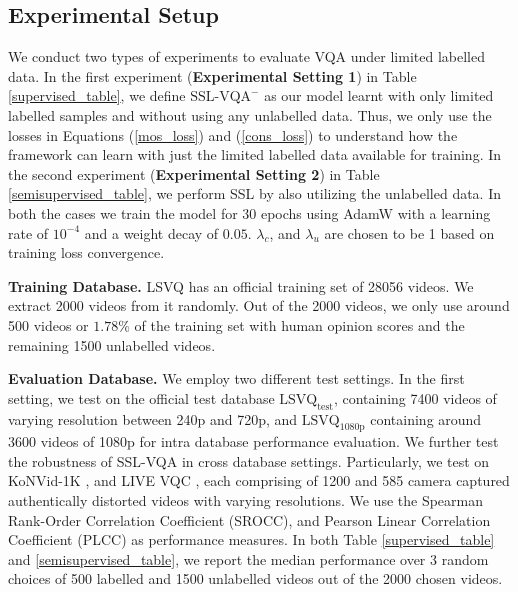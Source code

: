 \documentclass[10pt,twocolumn,letterpaper]{article}
\begin{document}
\subsection{Experimental Setup} %
We conduct two types of experiments to evaluate VQA under limited labelled data. In the first experiment (\textbf{Experimental Setting 1}) in Table \ref{supervised_table}, we define $\textrm{SSL-VQA}^{-}$ as our model learnt with only limited labelled samples and without using any unlabelled data. Thus, we only use the losses in Equations (\ref{mos_loss}) and (\ref{cons_loss}) to understand how the framework can learn with just the limited labelled data available for training. In the second experiment (\textbf{Experimental Setting 2}) in Table \ref{semisupervised_table}, we perform SSL by also utilizing the unlabelled data. In both the cases we train the model for 30 epochs using AdamW \cite{adamw} with a learning rate of  $10^{-4}$ and a weight decay of $0.05$. $\lambda_c$, and $\lambda_u$ are chosen to be 1 based on training loss convergence.%

\textbf{Training Database.} LSVQ \cite{patchVQ} has an official training set of 28056 videos. We extract 2000 videos from it randomly. Out of the 2000 videos, we only use around 500 videos or $1.78\%$ of the training set with human opinion scores and the remaining 1500 unlabelled videos.

\textbf{Evaluation Database.} We employ two different test settings. In the first setting, we test on the official test database $\textrm{LSVQ}_{\textrm{test}}$, 
 containing 7400 videos of varying resolution between 240p and 720p, and $\textrm{LSVQ}_{\textrm{1080p}}$ containing around 3600 videos of 1080p for intra database performance evaluation. We further test the robustness of SSL-VQA in cross database settings. Particularly, we test on KoNVid-1K \cite{konvid}, and LIVE VQC \cite{livevqc}, each comprising of 1200 and 585 camera captured authentically distorted videos with varying resolutions. We use the Spearman Rank-Order Correlation Coefficient (SROCC), and Pearson Linear Correlation Coefficient (PLCC) as performance measures. In both Table \ref{supervised_table} and \ref{semisupervised_table}, we report the median performance over 3 random choices of 500 labelled and 1500 unlabelled videos out of the 2000 chosen videos. 
\end{document}
